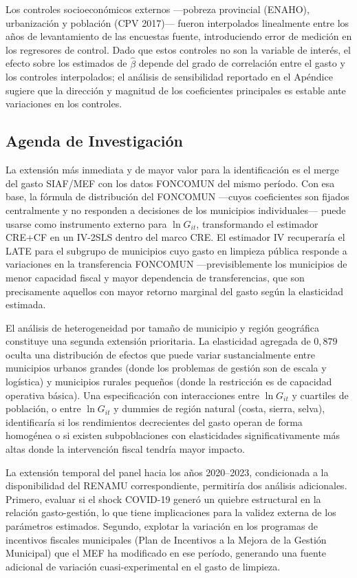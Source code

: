 Los controles socioeconómicos externos ---pobreza provincial (ENAHO), urbanización y población (CPV 2017)--- fueron interpolados linealmente entre los años de levantamiento de las encuestas fuente, introduciendo error de medición en los regresores de control. Dado que estos controles no son la variable de interés, el efecto sobre los estimados de $\hat{\beta}$ depende del grado de correlación entre el gasto y los controles interpolados; el análisis de sensibilidad reportado en el Apéndice sugiere que la dirección y magnitud de los coeficientes principales es estable ante variaciones en los controles.

\subsection{Agenda de Investigación}
\label{sec:agenda}

La extensión más inmediata y de mayor valor para la identificación es el merge del gasto SIAF/MEF con los datos FONCOMUN del mismo período. Con esa base, la fórmula de distribución del FONCOMUN ---cuyos coeficientes son fijados centralmente y no responden a decisiones de los municipios individuales--- puede usarse como instrumento externo para $\ln G_{it}$, transformando el estimador CRE+CF en un IV-2SLS dentro del marco CRE. El estimador IV recuperaría el LATE para el subgrupo de municipios cuyo gasto en limpieza pública responde a variaciones en la transferencia FONCOMUN ---previsiblemente los municipios de menor capacidad fiscal y mayor dependencia de transferencias, que son precisamente aquellos con mayor retorno marginal del gasto según la elasticidad estimada.

El análisis de heterogeneidad por tamaño de municipio y región geográfica constituye una segunda extensión prioritaria. La elasticidad agregada de $0{,}879$ oculta una distribución de efectos que puede variar sustancialmente entre municipios urbanos grandes (donde los problemas de gestión son de escala y logística) y municipios rurales pequeños (donde la restricción es de capacidad operativa básica). Una especificación con interacciones entre $\ln G_{it}$ y cuartiles de población, o entre $\ln G_{it}$ y dummies de región natural (costa, sierra, selva), identificaría si los rendimientos decrecientes del gasto operan de forma homogénea o si existen subpoblaciones con elasticidades significativamente más altas donde la intervención fiscal tendría mayor impacto.

La extensión temporal del panel hacia los años 2020--2023, condicionada a la disponibilidad del RENAMU correspondiente, permitiría dos análisis adicionales. Primero, evaluar si el shock COVID-19 generó un quiebre estructural en la relación gasto-gestión, lo que tiene implicaciones para la validez externa de los parámetros estimados. Segundo, explotar la variación en los programas de incentivos fiscales municipales (Plan de Incentivos a la Mejora de la Gestión Municipal) que el MEF ha modificado en ese período, generando una fuente adicional de variación cuasi-experimental en el gasto de limpieza.

